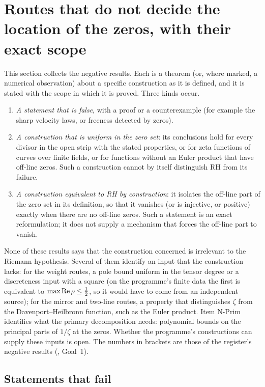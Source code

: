 \section{Routes that do not decide the location of the zeros, with their exact scope}\label{sec:negative}

This section collects the negative results. Each is a theorem (or, where marked, a numerical observation) about a specific construction as it is defined, and it is stated with the scope in which it is proved.
Three kinds occur.
\begin{enumerate}[label=(\roman*)]
\item \emph{A statement that is false}, with a proof or a counterexample (for example the sharp velocity laws, or freeness detected by zeros).
\item \emph{A construction that is uniform in the zero set}: its conclusions hold for every divisor in the open strip with the stated properties, or for zeta functions of curves over finite fields, or for functions without an Euler product that have off-line zeros. Such a construction cannot by itself distinguish RH from its failure.
\item \emph{A construction equivalent to RH by construction}: it isolates the off-line part of the zero set in its definition, so that it vanishes (or is injective, or positive) exactly when there are no off-line zeros. Such a statement is an exact reformulation; it does not supply a mechanism that forces the off-line part to vanish.
\end{enumerate}
None of these results says that the construction concerned is irrelevant to the Riemann hypothesis. Several of them identify an input that the construction lacks: for the weight routes, a pole bound uniform in the tensor degree or a discreteness input with a square (on the programme's finite data the first is equivalent to $\max\operatorname{Re}\rho\le\tfrac12$, so it would have to come from an independent source); for the mirror and two-line routes, a property that distinguishes $\zeta$ from the Davenport--Heilbronn function, such as the Euler product. Item N-Prim identifies what the primary decomposition needs: polynomial bounds on the principal parts of $1/\zeta$ at the zeros. Whether the programme's constructions can supply these inputs is open. The numbers in brackets are those of the register's negative results (, Goal~1).

\subsection{Statements that fail}

